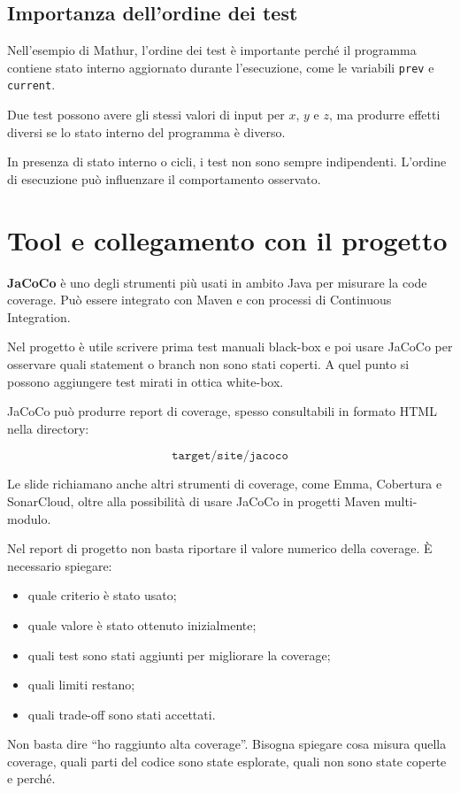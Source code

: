 \subsection{Importanza dell'ordine dei test}

Nell'esempio di Mathur, l'ordine dei test è importante perché il programma contiene stato interno aggiornato durante l'esecuzione, come le variabili \texttt{prev} e \texttt{current}.

Due test possono avere gli stessi valori di input per \(x\), \(y\) e \(z\), ma produrre effetti diversi se lo stato interno del programma è diverso.

\begin{notaesame}
In presenza di stato interno o cicli, i test non sono sempre indipendenti. L'ordine di esecuzione può influenzare il comportamento osservato.
\end{notaesame}

\section{Tool e collegamento con il progetto}

\textbf{JaCoCo} è uno degli strumenti più usati in ambito Java per misurare la code coverage. Può essere integrato con Maven e con processi di Continuous Integration.

\begin{notaprof}
Nel progetto è utile scrivere prima test manuali black-box e poi usare JaCoCo per osservare quali statement o branch non sono stati coperti. A quel punto si possono aggiungere test mirati in ottica white-box.
\end{notaprof}

JaCoCo può produrre report di coverage, spesso consultabili in formato HTML nella directory:

\[
\texttt{target/site/jacoco}
\]

\begin{notaslide}
Le slide richiamano anche altri strumenti di coverage, come Emma, Cobertura e SonarCloud, oltre alla possibilità di usare JaCoCo in progetti Maven multi-modulo.
\end{notaslide}

Nel report di progetto non basta riportare il valore numerico della coverage. È necessario spiegare:

\begin{itemize}
    \item quale criterio è stato usato;
    \item quale valore è stato ottenuto inizialmente;
    \item quali test sono stati aggiunti per migliorare la coverage;
    \item quali limiti restano;
    \item quali trade-off sono stati accettati.
\end{itemize}

\begin{notaesame}
Non basta dire ``ho raggiunto alta coverage''. Bisogna spiegare cosa misura quella coverage, quali parti del codice sono state esplorate, quali non sono state coperte e perché.
\end{notaesame}